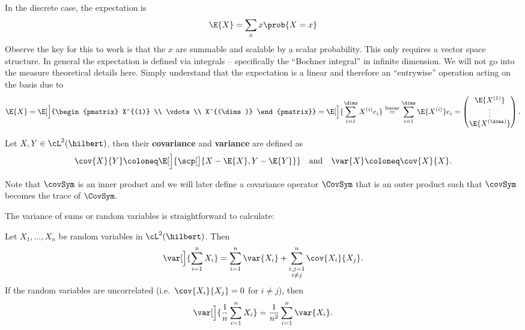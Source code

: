 \begin{remark}
    \label{rem: expectation in multiple dimensions}
    In the discrete case, the expectation is
    \[
        \E{X} = \sum_{x} x \prob{X = x}
    \]
    Observe the key for this to work is that the \(x\) are summable and scalable
    by a scalar probability. This only requires a vector space structure.  
    In general the expectation is defined via integrals -- specifically the
    ``Bochner integral'' in infinite dimension. We will not go into the measure
    theoretical details here. Simply understand that the expectation is a linear
    and therefore an ``entrywise'' operation acting on the basis due to
    \[
        \E{X}
        = \E[\Big]{\begin{pmatrix}
            X^{(1)} \\
            \vdots \\
            X^{(\dims)}
        \end{pmatrix}}
        = \E[\Big]{\sum_{i=1}^\dims X^{(i)} e_i}
        \overset{\text{linear}}= \sum_{i=1}^\dims \E{X^{(i)}} e_i
        = \begin{pmatrix}
            \E{X^{(1)}} \\
            \vdots \\
            \E{X^{(\dims)}}
        \end{pmatrix}.
    \]
\end{remark}

\begin{definition}[Covariance]
    \label{def: covariance and variance definition}
    Let \(X, Y \in \cL^2(\hilbert)\), then their \textbf{covariance}
    and \textbf{variance} are defined as
    \[
        \cov{X}{Y} \coloneq \E[\Big]{\scp[\big]{X-\E{X}, Y-\E{Y}}}
        \quad \text{and} \quad
        \var{X} \coloneq \cov{X}{X}.
    \]
\end{definition}

\begin{remark}
Note that \(\covSym\) is an inner product and we will later define
a covariance operator \(\CovSym\) that is an outer product such that \(\covSym\)
becomes the trace of \(\CovSym\).
\end{remark}
The variance of sums or random variables is straightforward to calculate:

\begin{mdframed}[innertopmargin=0pt]
\begin{lemma}[Bienaymé]
    \label{lem: Bienaymé}
    Let \(X_1, \dots, X_n\) be random variables in \(\cL^2(\hilbert)\). Then
    \[
        \var[\Big]{\sum_{i=1}^n X_i} = \sum_{i=1}^n \var{X_i} + \sum_{\substack{i,j=1\\i \neq j}}^n \cov{X_i}{X_j}.
    \]
    If the random variables are uncorrelated (i.e.\ \(\cov{X_i}{X_j} = 0\) for \(i\neq j\)), then
    \[
        \var[\Big]{\frac1n \sum_{i=1}^n X_i} = \frac1{n^2} \sum_{i=1}^n \var{X_i}.
    \]
\end{lemma}
\end{mdframed}

